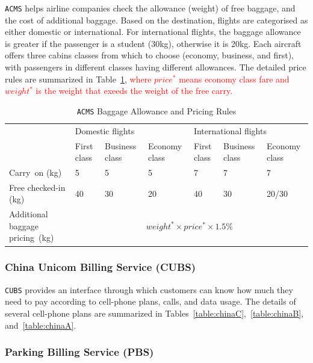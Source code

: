 \documentclass[10pt,journal,compsoc]{IEEEtran}
\begin{document}
\texttt{ACMS} helps airline companies check the allowance (weight) of free baggage, and the cost of additional baggage.
Based on the destination, flights are categorised as either domestic or international.
For international flights, the baggage allowance is greater if the passenger is a student (30kg), otherwise it is 20kg.
Each aircraft offers three cabins classes from which to choose (economy, business, and first), with passengers in different classes having different allowances.
The detailed price rules are summarized in Table~\ref{tab:aviation}, \textcolor{red}{where $price^*$ means economy class fare and $weight^*$ is the weight that exeeds the weight of the free carry.}

\begin{table}
  \caption{\texttt{ACMS} Baggage Allowance and Pricing Rules}
  \label{tab:aviation}
  \centering
  \begin{tabular}{lllllll} \toprule
  \multirow{2}{*}{}     &\multicolumn{3}{l}{Domestic flights} &\multicolumn{3}{l}{International flights} \\ \cmidrule(lr){2-4} \cmidrule(lr){5-7}
                       &First class  &Business class   &Economy class   &First class  &Business class   &Economy class \\ \midrule
  Carry~on (kg)   &5       &5        &5        &7        &7        &7  \\
  Free checked-in (kg)   &40      &30       &20       &40       &30       &20/30 \\
  Additional baggage pricing~(kg)   &\multicolumn{6}{c}{$weight^* \times price^* \times 1.5\%$}     \\ \bottomrule
  \end{tabular}
\end{table}

\subsubsection{China Unicom Billing Service (CUBS)}
\label{sec:cubs}

\texttt{CUBS} provides an interface through which customers can know how much they need to pay according to cell-phone plans, calls, and data usage.
The details of several cell-phone plans are summarized in Tables~\ref{table:chinaC},~\ref{table:chinaB}, and~\ref{table:chinaA}.



\subsubsection{Parking Billing Service (PBS)}
\label{sec:pbs}
\end{document}
